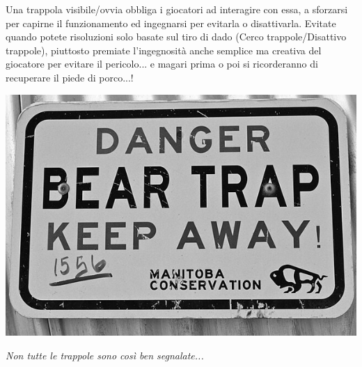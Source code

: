 \bigskip

\begin{narratore}
Una trappola visibile/ovvia obbliga i giocatori ad interagire con essa, a sforzarsi per capirne il funzionamento ed ingegnarsi per evitarla o disattivarla. Evitate quando potete risoluzioni solo basate sul tiro di dado (Cerco trappole/Disattivo trappole), piuttosto premiate l'ingegnosità anche semplice ma creativa del giocatore per evitare il pericolo... e magari prima o poi si ricorderanno di recuperare il piede di porco...!
\end{narratore}

\vfill

\begin{center}
	\includegraphics[width=0.65\linewidth]{immagini/Bear_trap.png}

	\emph{Non tutte le trappole sono così ben segnalate...}
\end{center}

\pagebreak
